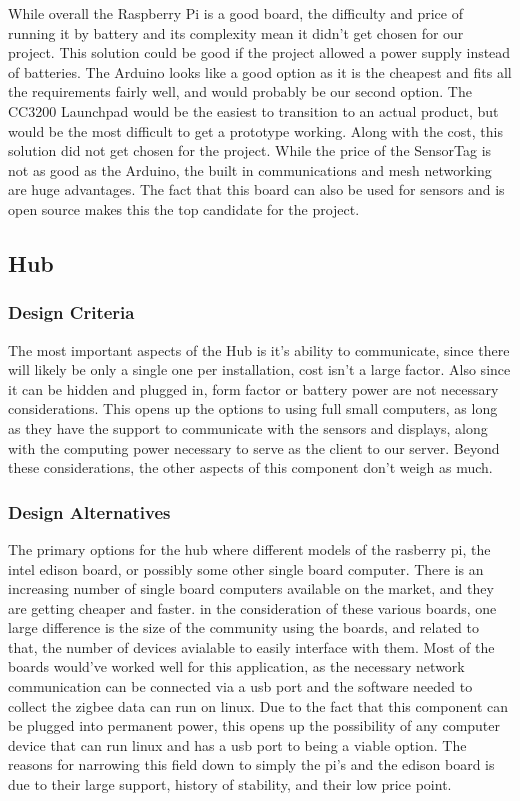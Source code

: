 \documentclass[ppfs.tex]{template/subfiles}
\begin{document}
While overall the Raspberry Pi is a good board, the difficulty and price of running it by battery and its complexity mean it didn’t get chosen for our project. This solution could be good if the project allowed a power supply instead of batteries. The Arduino looks like a good option as it is the cheapest and fits all the requirements fairly well, and would probably be our second option. The CC3200 Launchpad would be the easiest to transition to an actual product, but would be the most difficult to get a prototype working. Along with the cost, this solution did not get chosen for the project. While the price of the SensorTag is not as good as the Arduino, the built in communications and mesh networking are huge advantages. The fact that this board can also be used for sensors and is open source makes this the top candidate for the project.

\subsection{Hub}

\subsubsection{Design Criteria}
The most important aspects of the Hub is it's ability to communicate, since there will likely be only a single one per installation, cost isn't a large factor. Also since it can be hidden and plugged in, form factor or battery power are not necessary considerations. This opens up the options to using full small computers, as long as they have the support to communicate with the sensors and displays, along with the computing power necessary to serve as the client to our server. Beyond these considerations, the other aspects of this component don't weigh as much.

\subsubsection{Design Alternatives}
The primary options for the hub where different models of the rasberry pi, the intel edison board, or possibly some other single board computer. There is an increasing number of single board computers available on the market, and they are getting cheaper and faster. in the consideration of these various boards, one large difference is the size of the community using the boards, and related to that, the number of devices avialable to easily interface with them. Most of the boards would've worked well for this application, as the necessary network communication can be connected via a usb port and the software needed to collect the zigbee data can run on linux. Due to the fact that this component can be plugged into permanent power, this opens up the possibility of any computer device that can run linux and has a usb port to being a viable option. The reasons for narrowing this field down to simply the pi's and the edison board is due to their large support, history of stability, and their low price point. 
\end{document}
